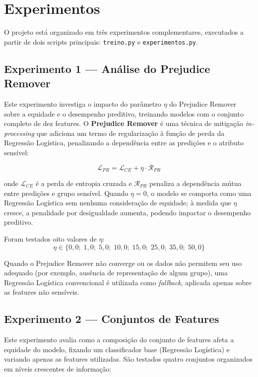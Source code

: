 \section{Experimentos}
\label{sec:experimentos}

O projeto está organizado em três experimentos complementares, executados a partir de dois scripts principais: \texttt{treino.py} e \texttt{experimentos.py}.

\subsection{Experimento 1 — Análise do Prejudice Remover}

Este experimento investiga o impacto do parâmetro $\eta$ do Prejudice Remover sobre a equidade e o desempenho preditivo, treinando modelos com o conjunto completo de dez features. O \textbf{Prejudice Remover} \cite{kamishima2012fairness} é uma técnica de mitigação \textit{in-processing} que adiciona um termo de regularização à função de perda da Regressão Logística, penalizando a dependência entre as predições e o atributo sensível:

\[
\mathcal{L}_{PR} = \mathcal{L}_{CE} + \eta \cdot \mathcal{R}_{PR}
\]

onde $\mathcal{L}_{CE}$ é a perda de entropia cruzada e $\mathcal{R}_{PR}$ penaliza a dependência mútua entre predições e grupo sensível. Quando $\eta = 0$, o modelo se comporta como uma Regressão Logística sem nenhuma consideração de equidade; à medida que $\eta$ cresce, a penalidade por desigualdade aumenta, podendo impactar o desempenho preditivo.

Foram testados oito valores de $\eta$:
\[
\eta \in \{0{,}0;\; 1{,}0;\; 5{,}0;\; 10{,}0;\; 15{,}0;\; 25{,}0;\; 35{,}0;\; 50{,}0\}
\]

Quando o Prejudice Remover não converge ou os dados não permitem seu uso adequado (por exemplo, ausência de representação de algum grupo), uma Regressão Logística convencional é utilizada como \textit{fallback}, aplicada apenas sobre as features não sensíveis.

\subsection{Experimento 2 — Conjuntos de Features}

Este experimento avalia como a composição do conjunto de features afeta a equidade do modelo, fixando um classificador base (Regressão Logística) e variando apenas as features utilizadas. São testados quatro conjuntos organizados em níveis crescentes de informação:

